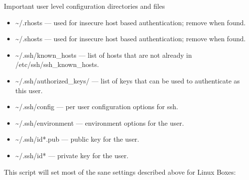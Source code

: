Important user level configuration directories and files
\begin{itemize}
	\item \~{}/.rhosts --- used for insecure host based authentication; remove when found.
	\item \~{}/.shosts --- used for insecure host based authentication; remove when found.
	\item \~{}/.ssh/known\_hosts --- list of hosts that are not already in /etc/ssh/ssh\_known\_hosts.
	\item \~{}/.ssh/authorized\_keys/ --- list of keys that can be used to authenticate as this user.
	\item \~{}/.ssh/config --- per user configuration options for ssh.
	\item \~{}/.ssh/environment --- environment options for the user.
	\item \~{}/.ssh/id*.pub --- public key for the user.
	\item \~{}/.ssh/id* --- private key for the user.
\end{itemize}

This script will set most of the sane settings described above for Linux Boxes:
